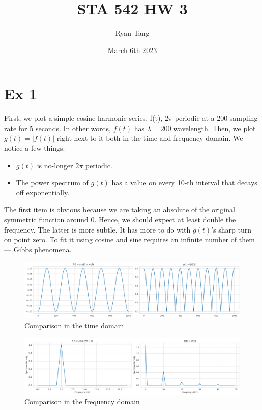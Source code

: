 \documentclass[11pt, letterpaper]{article}
\author{Ryan Tang}
\title{STA 542 HW 3}
\date{March 6th 2023}
\begin{document}
\maketitle

\section{Ex 1}
First, we plot a simple cosine harmonic series, f(t), $2\pi$ periodic at a 200 sampling rate for 5 seconds. In other words, $f(t)$ has $\lambda = 200$ wavelength. Then, we plot $g(t)=|f(t)|$ right next to it both in the time and frequency domain. We notice a few things.
\begin{itemize}
    \item $g(t)$ is no-longer $2\pi$ periodic.
    \item The power spectrum of $g(t)$ has a value on every 10-th interval that decays off exponentially. 
\end{itemize}

The first item is obvious because we are taking an absolute of the original symmetric function around 0. Hence, we should expect at least double the frequency. The latter is more subtle. It has more to do with $g(t)$'s sharp turn on point zero. To fit it using cosine and sine requires an infinite number of them --- Gibbs phenomena.

\begin{figure}[!h]
  \centering
  \includegraphics[width=1.0\textwidth]{1-1.png}
  \captionsetup{justification=centering}
  \caption{Comparison in the time domain}
\end{figure}

\begin{figure}[!h]
  \centering
  \includegraphics[width=1.0\textwidth]{1-2.png}
  \captionsetup{justification=centering}
  \caption{Comparison in the frequency domain}
\end{figure}
\end{document}
